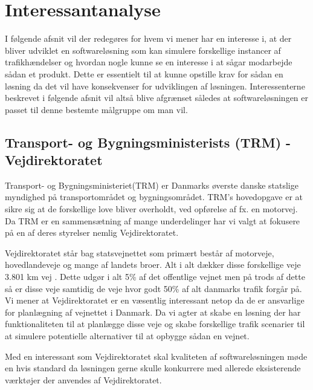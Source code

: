 \chapter{Interessantanalyse}\label{Interessentanalyse}

I følgende afsnit vil der redegøres for hvem vi mener har en interesse i, at der bliver udviklet en softwareløsning som kan simulere forskellige instancer af trafikhændelser og hvordan nogle kunne se en interesse i at sågar modarbejde sådan et produkt. Dette er essentielt til at kunne opstille krav for sådan en løsning da det vil have konsekvenser for udviklingen af løsningen. Interessenterne beskrevet i følgende afsnit vil altså blive afgrænset således at softwareløsningen er passet til denne bestemte målgruppe om man vil.

\section {Transport- og Bygningsministerists (TRM) - Vejdirektoratet}\label{TRM}

Transport- og Bygningsministeriet(TRM) er Danmarks øverste danske statslige myndighed på transportområdet og bygningsområdet. TRM’s hovedopgave er at sikre sig at de forskellige love bliver overholdt, ved opførelse af fx. en motorvej. Da TRM er en sammensætning af mange underdelinger har vi valgt at fokusere på en af deres styrelser nemlig Vejdirektoratet.

\vspace{5mm}

Vejdirektoratet står bag statsvejnettet som primært består af motorveje, hovedlandeveje og mange af landets broer. Alt i alt dækker disse forskellige veje 3.801 km vej \cite{Vejdirektoratet}. Dette udgør i alt 5\% af det offentlige vejnet men på trods af dette så er disse veje samtidig de veje hvor godt 50\% af alt danmarks trafik forgår på. Vi mener at Vejdirektoratet er en væsentlig interessant netop da de er ansvarlige for planlægning af vejnettet i Danmark. Da vi agter at skabe en løsning der har funktionaliteten til at planlægge disse veje og skabe forskellige trafik scenarier til at simulere potentielle alternativer til at opbygge sådan en vejnet.

\vspace{5mm}

Med en interessant som Vejdirektoratet skal kvaliteten af softwareløsningen møde en hvis standard da løsningen gerne skulle konkurrere med allerede eksisterende værktøjer der anvendes af Vejdirektoratet.

